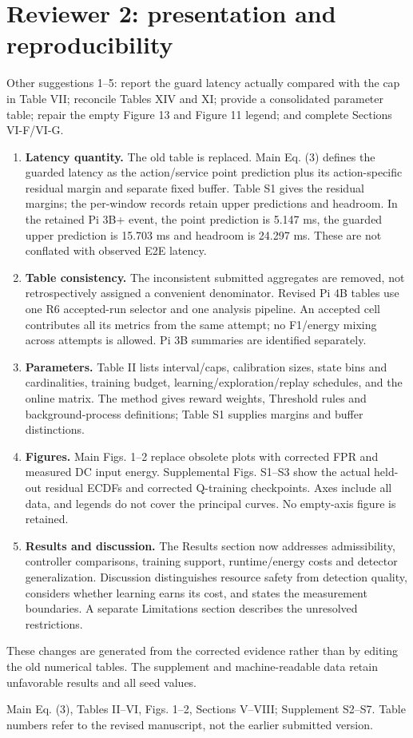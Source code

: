 \documentclass[10pt,a4paper]{article}
\newcommand{\commentbox}[1]{\begin{rcommentbox}#1\end{rcommentbox}}
\newcommand{\responsebox}[1]{\begin{authorresponsebox}#1\end{authorresponsebox}}
\newcommand{\changebox}[1]{\begin{wherebox}#1\end{wherebox}}
\begin{document}
\clearpage
\section*{Reviewer 2: presentation and reproducibility}
\commentbox{Other suggestions 1--5: report the guard latency actually compared with the cap in Table VII; reconcile Tables XIV and XI; provide a consolidated parameter table; repair the empty Figure 13 and Figure 11 legend; and complete Sections VI-F/VI-G.}
\responsebox{
\begin{enumerate}
\item \textbf{Latency quantity.} The old table is replaced. Main Eq. (3) defines the guarded latency as the action/service point prediction plus its action-specific residual margin and separate fixed buffer. Table S1 gives the residual margins; the per-window records retain upper predictions and headroom. In the retained Pi 3B+ event, the point prediction is 5.147 ms, the guarded upper prediction is 15.703 ms and headroom is 24.297 ms. These are not conflated with observed E2E latency.
\item \textbf{Table consistency.} The inconsistent submitted aggregates are removed, not retrospectively assigned a convenient denominator. Revised Pi 4B tables use one R6 accepted-run selector and one analysis pipeline. An accepted cell contributes all its metrics from the same attempt; no F1/energy mixing across attempts is allowed. Pi 3B summaries are identified separately.
\item \textbf{Parameters.} Table II lists interval/caps, calibration sizes, state bins and cardinalities, training budget, learning/exploration/replay schedules, and the online matrix. The method gives reward weights, Threshold rules and background-process definitions; Table S1 supplies margins and buffer distinctions.
\item \textbf{Figures.} Main Figs. 1--2 replace obsolete plots with corrected FPR and measured DC input energy. Supplemental Figs. S1--S3 show the actual held-out residual ECDFs and corrected Q-training checkpoints. Axes include all data, and legends do not cover the principal curves. No empty-axis figure is retained.
\item \textbf{Results and discussion.} The Results section now addresses admissibility, controller comparisons, training support, runtime/energy costs and detector generalization. Discussion distinguishes resource safety from detection quality, considers whether learning earns its cost, and states the measurement boundaries. A separate Limitations section describes the unresolved restrictions.
\end{enumerate}
These changes are generated from the corrected evidence rather than by editing the old numerical tables. The supplement and machine-readable data retain unfavorable results and all seed values.
}
\changebox{Main Eq. (3), Tables II--VI, Figs. 1--2, Sections V--VIII; Supplement S2--S7. Table numbers refer to the revised manuscript, not the earlier submitted version.}
\end{document}
